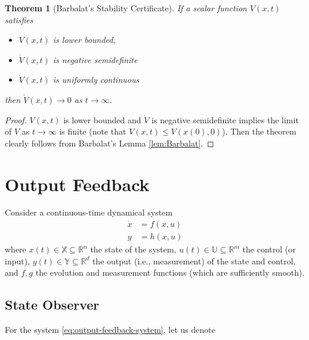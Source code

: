 \documentclass[
]{book}
\newtheorem{theorem}{Theorem}[chapter]
\theoremstyle{definition}
\theoremstyle{definition}
\theoremstyle{definition}
\theoremstyle{definition}
\theoremstyle{remark}
\begin{document}
\begin{theorem}[Barbalat's Stability Certificate]
\protect\hypertarget{thm:BarbalatStability}{}\label{thm:BarbalatStability}If a scalar function \(V(x,t)\) satisfies

\begin{itemize}
\item
  \(V(x,t)\) is lower bounded,
\item
  \(\dot{V}(x,t)\) is negative semidefinite
\item
  \(\dot{V}(x,t)\) is uniformly continuous
\end{itemize}

then \(\dot{V}(x,t) \rightarrow 0\) as \(t \rightarrow \infty\).
\end{theorem}

\begin{proof}
\(V(x,t)\) is lower bounded and \(\dot{V}\) is negative semidefinite implies the limit of \(V\) as \(t \rightarrow \infty\) is finite (note that \(V(x,t) \leq V(x(0),0)\)). Then the theorem clearly follows from Barbalat's Lemma \ref{lem:Barbalat}.
\end{proof}

\hypertarget{output-feedback}{%
\chapter{Output Feedback}\label{output-feedback}}

Consider a continuous-time dynamical system
\begin{equation}
\begin{split}
\dot{x} &= f(x,u)  \\
y &= h(x,u)
\end{split} 
\label{eq:output-feedback-system}
\end{equation}
where \(x(t) \in \mathbb{X} \subseteq \mathbb{R}^n\) the state of the system, \(u(t) \in \mathbb{U} \subseteq \mathbb{R}^m\) the control (or input), \(y(t) \in \mathbb{Y} \subseteq \mathbb{R}^{d}\) the output (i.e., measurement) of the state and control, and \(f,g\) the evolution and measurement functions (which are sufficiently smooth).

\hypertarget{state-observer}{%
\section{State Observer}\label{state-observer}}

For the system \eqref{eq:output-feedback-system}, let us denote
\end{document}

